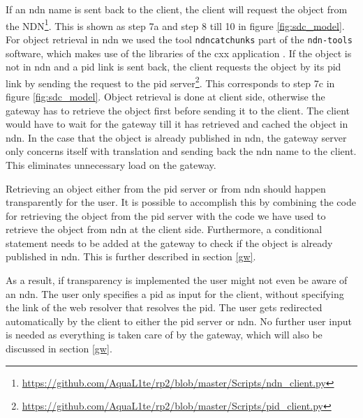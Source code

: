 If an \gls{ndn} name is sent back to the client, the client will request the object from the NDN\footnote{\url{https://github.com/AquaL1te/rp2/blob/master/Scripts/ndn_client.py}}. This is shown as step 7a and step 8 till 10 in figure \ref{fig:sdc_model}. For object retrieval in \gls{ndn} we used the tool \texttt{ndncatchunks} part of the \texttt{ndn-tools} software, which makes use of the libraries of the \gls{cxx} application \cite{ndn-tools}. 
If the object is not in \gls{ndn} and a \gls{pid} link is sent back, the client requests the object by its \gls{pid} link by sending the request to the \gls{pid} server\footnote{\url{https://github.com/AquaL1te/rp2/blob/master/Scripts/pid_client.py}}. This corresponds to step 7c in figure \ref{fig:sdc_model}. Object retrieval is done at client side, otherwise the gateway has to retrieve the object first before sending it to the client. 
The client would have to wait for the gateway till it has retrieved and cached the object in \gls{ndn}. 
In the case that the object is already published in \gls{ndn}, the gateway server only concerns itself with translation and sending back the \gls{ndn} name to the client. This eliminates unnecessary load on the gateway.

Retrieving an object either from the \gls{pid} server or from \gls{ndn} should happen transparently for the user. It is possible to accomplish this by combining the code for retrieving the object from the \gls{pid} server with the code we have used to retrieve the object from \gls{ndn} at the client side. Furthermore, a conditional statement needs to be added at the gateway to check if the object is already published in \gls{ndn}. This is further described in section \ref{gw}.

As a result, if transparency is implemented the user might not even be aware of an \gls{ndn}. The user only specifies a \gls{pid} as input for the client, without specifying the link of the web resolver that resolves the \gls{pid}. The user gets redirected automatically by the client to either the \gls{pid} server or \gls{ndn}. No further user input is needed as everything is taken care of by the gateway, which will also be discussed in section \ref{gw}.

